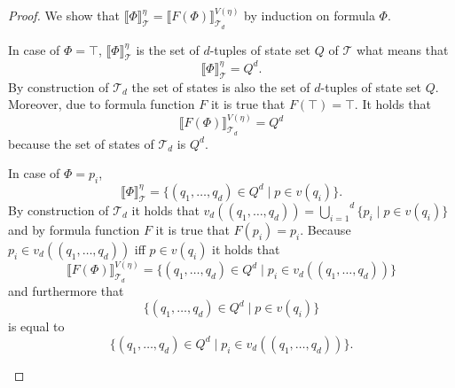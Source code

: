 \begin{proof}
    We show that $\llbracket \Phi \rrbracket^\eta_\mathcal{T} = \llbracket F(\Phi) \rrbracket^{V(\eta)}_{\mathcal{T}_d}$ by induction on formula $\Phi$.
    \begin{compactitem}
        \item In case of $\Phi = \top$, $\llbracket \Phi
        \rrbracket^\eta_\mathcal{T}$ is the set of $d$-tuples of state set $Q$ of $\mathcal{T}$ what means that
        \[\llbracket \Phi \rrbracket^\eta_\mathcal{T} = Q^d.\]
        By construction of $\mathcal{T}_d$ the set of states is also the set of $d$-tuples of state set $Q$.
        Moreover, due to formula function $F$ it is true that $F(\top) = \top$. It holds that
        \[\llbracket F(\Phi) \rrbracket^{V(\eta)}_{\mathcal{T}_d} = Q^d\]
        because the set of states of $\mathcal{T}_d$ is $Q^d$.

        \item In case of $\Phi = p_i$,
        \[\llbracket \Phi
        \rrbracket^\eta_\mathcal{T} = \{(q_1, \dots, q_d)\in Q^d \mid p \in v(q_i)\}.\]
        By construction of $\mathcal{T}_d$ it holds that $v_d((q_1, \dots, q_d)) = \overset{d}{\underset{i = 1}{\bigcup}}\{p_i
        \mid p \in v(q_i)\}$ and by formula function $F$ it is true that $F(p_i) = p_i$. Because $p_i \in v_d((q_1,
        \dots, q_d))$ iff $p \in v(q_i)$ it holds that
        \[\llbracket F(\Phi) \rrbracket^{V(\eta)}_{\mathcal{T}_d} = \{
        (q_1, \dots, q_d) \in Q^d \mid p_i \in v_d((q_1, \dots, q_d))\}\]
        and furthermore that
        \[\{(q_1, \dots, q_d)\in Q^d \mid p \in v(q_i)\}\] is equal to \[\{(q_1, \dots, q_d) \in Q^d \mid p_i \in
        v_d((q_1, \dots, q_d))\}.\]


\end{compactitem}
\end{proof}
